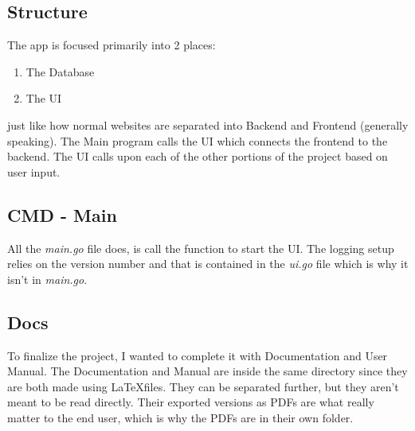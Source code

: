\newpage



\subsection{Structure}

The app is focused primarily into 2 places:
\begin{enumerate}
	\item The Database
	\item The UI
\end{enumerate}
just like how normal websites are separated into Backend and Frontend
(generally speaking).
The Main program calls the UI which connects the frontend to the backend.
The UI calls upon each of the other portions of the project based on user input.

\subsection{CMD - Main}

All the \textit{main.go} file does, is call the function to start the
UI. The logging
setup relies on the version number and that is contained in the
\textit{ui.go} file
which is why it isn't in \textit{main.go}.

\subsection{Docs}

To finalize the project, I wanted to complete it with Documentation
and User Manual.
The Documentation and Manual are inside the same directory since they
are both made using \LaTeX files. They can be separated further, but
they aren't meant to be read directly. Their exported versions as
PDFs are what really matter to
the end user, which is why the PDFs are in their own folder.

